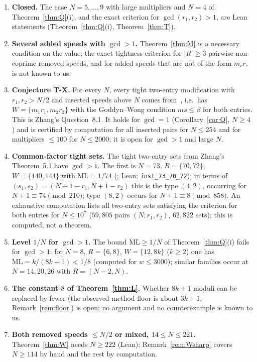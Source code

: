 \documentclass[11pt]{article}
\theoremstyle{definition}
\theoremstyle{remark}
\newcommand{\ML}{\mathrm{ML}}
\begin{document}
\begin{enumerate}[label=(\arabic*)]
\item \textbf{Closed.} The case $N=5,\dots,9$ with large multipliers and $N=4$ of Theorem~\ref{thm:Q}(i), and the exact criterion for $\gcd(r_1,r_2)>1$, are Lean statements (Theorem~\ref{thm:Q}(i), Theorem~\ref{thm:T}).
\item \textbf{Several added speeds with $\gcd>1$.} Theorem~\ref{thm:M} is a necessary condition on the value; the exact tightness criterion for $|R|\ge3$ pairwise non-coprime removed speeds, and for added speeds that are not of the form $m_rr$, is not known to us.
\item \textbf{Conjecture T-X.}\label{conj:TX} For every $N$, every tight two-entry modification with $r_1,r_2>N/2$ and inserted speeds above $N$ comes from~\cite[Thm.~5.1]{Z}, i.e.\ has $W=\{m_1r_1,m_2r_2\}$ with the Goddyn--Wong condition $ms\le\beta$ for both entries. This is Zhang's Question~8.1. It holds for $\gcd=1$ (Corollary~\ref{cor:Q}, $N\ge4$) and is certified by computation for all inserted pairs for $N\le254$ and for multipliers $\le100$ for $N\le2000$; it is open for $\gcd>1$ and large $N$.
\item \textbf{Common-factor tight sets.} The tight two-entry sets from Zhang's Theorem~5.1 have $\gcd>1$. The first is $N=73$, $R=\{70,72\}$, $W=\{140,144\}$ with $\ML=1/74$ (\cite[Ex.~5.2]{Z}; Lean: \texttt{inst\_73\_70\_72}); in terms of $(s_1,s_2)=(N+1-r_1,N+1-r_2)$ this is the type $(4,2)$, occurring for $N+1\equiv74\pmod{210}$; type $(8,2)$ occurs for $N+1\equiv8\pmod{858}$. An exhaustive computation lists all two-entry sets satisfying the criterion for both entries for $N\le10^7$ ($59{,}805$ pairs $(N;r_1,r_2)$, $62{,}822$ sets); this is computed, not a theorem.
\item \textbf{Level $1/N$ for $\gcd>1$.} The bound $\ML\ge1/N$ of Theorem~\ref{thm:Q}(i) fails for $\gcd>1$: for $N=8$, $R=\{6,8\}$, $W=\{12,8k\}$ ($k\ge2$) one has $\ML=k/(8k+1)<1/8$ (computed for $w\le3000$); similar families occur at $N=14,20,26$ with $R=(N-2,N)$.
\item \textbf{The constant $8$ of Theorem~\ref{thm:L}.} Whether $8k+1$ moduli can be replaced by fewer (the observed method floor is about $3k+1$, Remark~\ref{rem:floor}) is open; no argument and no counterexample is known to us.
\item \textbf{Both removed speeds $\le N/2$ or mixed, $14\le N\le221$.} Theorem~\ref{thm:W} needs $N\ge222$ (Lean); Remark~\ref{rem:Wsharp} covers $N\ge114$ by hand and the rest by computation.
\end{enumerate}
\end{document}
